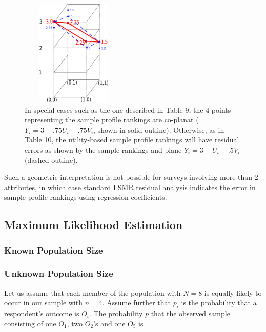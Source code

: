 \documentclass[a4paper, 12pt]{article}
\begin{document}
\begin{figure}[!htpb]
	\centering
	\includegraphics[width=2in,height=2in]{sec4fig.eps}
	\caption{{\small In special cases such  as the one described in Table 9, the 4 points representing the sample profile rankings are co-planar ($Y_i=3-.75U_i-.75V_i$, shown in solid outline). Otherwise, as in Table 10, the utility-based sample profile rankings will have residual errors as shown by the sample rankings and plane  $Y_i=3-U_i-.5V_i$ (dashed outline). }}	
	\label{sec4fig}
\end{figure}

{\flushleft Such a} geometric interpretation  is not possible for surveys involving more than 2 attributes, in which case standard LSMR residual analysis indicates the error in sample  profile rankings using regression coefficients.


\subsection{Maximum Likelihood Estimation}
\subsubsection{Known Population Size}
\subsubsection{Unknown Population Size}


Let us assume that each member of the population with $N=8$ is equally likely to occur in our sample with $n=4$. Assume further that $p_i$ is the probability that a respondent's outcome is $O_i$. The probability $p$ that the observed sample consisting of one $O_1$, two $O_2$'s and one $O_5$ is
\end{document}
